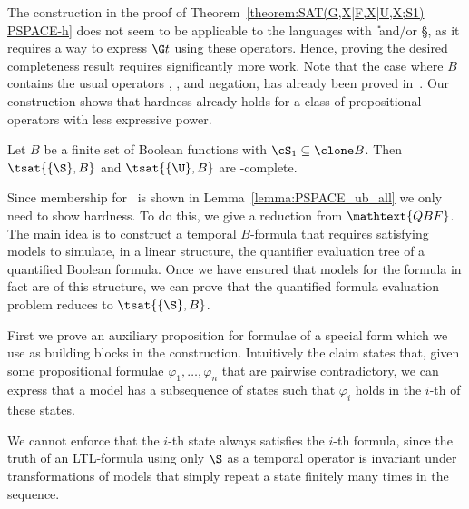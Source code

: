 The construction in the proof of Theorem~\ref{theorem:SAT(G,X|F,X|U,X;S1) PSPACE-h} does not seem to be applicable to the languages
with \U\ and/or \S, as it requires a way to express $\G t$ using these operators. Hence, proving the desired completeness result
requires significantly more work.
Note that the case where $B$ contains the usual operators \AND, \OR, and negation, has already been proved in~\cite{mar04}. Our construction shows that hardness already holds for a class of propositional operators with less expressive power.



\begin{theorem}\label{theorem:SAT(S;BF) SAT(S|U;S1) PSPACE-h}
Let $B$ be a finite set of Boolean functions with $\cS_1 \subseteq \clone B$.
        Then $\tsat{\{\S\},B}$ and $\tsat{\{\U\},B}$ are \PSPACE-complete.
\end{theorem}


  \proof Since membership for \PSPACE\ is shown in Lemma~\ref{lemma:PSPACE_ub_all} we only need to show hardness. To do this, we give a reduction from $\mathtext{QBF}$. The main idea is to construct a temporal $B$-formula that requires satisfying models to simulate, in a linear structure, the quantifier evaluation tree of a quantified Boolean formula. Once we have ensured that models for the formula in fact are of this structure, we can prove that the quantified formula evaluation problem reduces to $\tsat{\{\S\},B}$.

    First we prove an auxiliary proposition for formulae of a special form which we use as building blocks in the construction. Intuitively the claim states that, given some propositional formulae $\varphi_1,\dots,\varphi_n$ that are pairwise contradictory, we can express that a model has a subsequence of states such that $\varphi_i$ holds in the $i$-th of these states.

    We cannot enforce that the $i$-th state always satisfies the $i$-th formula, since the truth of an LTL-formula using only $\S$ as a temporal operator is invariant under transformations of models that simply repeat a state finitely many times in the sequence.


